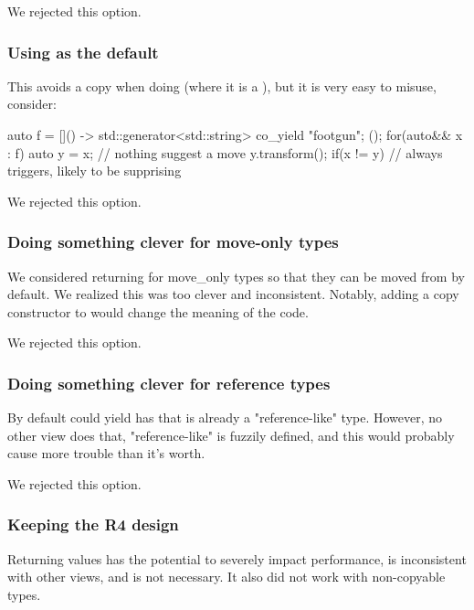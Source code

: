 \documentclass{wg21}
\begin{document}
We rejected this option.

\subsubsection{Using  as the default}

This avoids a copy when doing  (where it is a ),
but it is very easy to misuse, consider:

\begin{colorblock}
auto f = []() -> std::generator<std::string> { co_yield "footgun"; }();
for(auto&& x : f) {
    auto y = x; // nothing suggest a move
    y.transform();
    if(x != y) {
        // always triggers, likely to be supprising
    }
}

\end{colorblock}
We rejected this option.


\subsubsection{Doing something clever for move-only types}

We considered returning  for move_only types so that they can be moved from by default.
We realized this was too clever and inconsistent.
Notably, adding a copy constructor to  would change the meaning of the code.

We rejected this option.

\subsubsection{Doing something clever for reference types}

By default  could yield  has that is already a "reference-like" type.
However, no other view does that, "reference-like" is fuzzily defined, and this would probably cause more trouble than it's worth.

We rejected this option.

\subsubsection{Keeping the R4 design}

Returning values has the potential to severely impact performance, is inconsistent with other views, and is not necessary.
It also did not work with non-copyable types.
\end{document}
